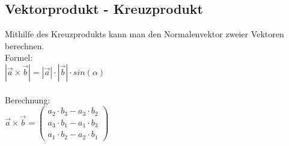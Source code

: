 \subsection{Vektorprodukt - Kreuzprodukt}
\label{sec:kreuzprodukt}
Mithilfe des Kreuzprodukts kann man den Normalenvektor zweier Vektoren berechnen. \\
Formel: \\
$
|\vec{a} \times \vec{b}| = |\vec{a}| \cdot |\vec{b}| \cdot sin(\alpha)
$
\\\\
Berechnung: \\
$
\vec{a} \times \vec{b} = 
\begin{pmatrix}
    a_2 \cdot b_3 - a_3 \cdot b_2 \\
    a_3 \cdot b_1 - a_1 \cdot b_3 \\
    a_1 \cdot b_2 - a_2 \cdot b_1
\end{pmatrix}
$
